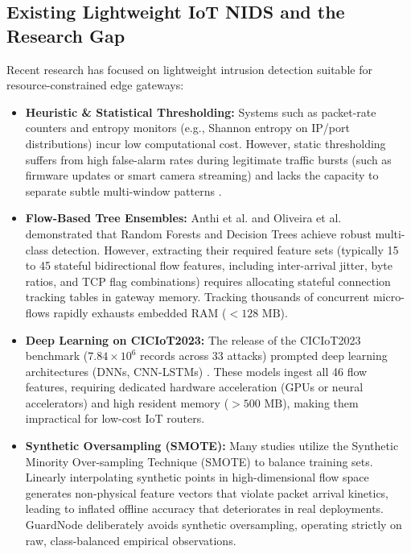 \documentclass[conference]{IEEEtran}
\begin{document}
\subsection{Existing Lightweight IoT NIDS and the Research Gap}
Recent research has focused on lightweight intrusion detection suitable for resource-constrained edge gateways:
\begin{itemize}
    \item \textbf{Heuristic & Statistical Thresholding:} Systems such as packet-rate counters and entropy monitors (e.g., Shannon entropy on IP/port distributions) incur low computational cost. However, static thresholding suffers from high false-alarm rates during legitimate traffic bursts (such as firmware updates or smart camera streaming) and lacks the capacity to separate subtle multi-window patterns \cite{ref_chaabouni}.
    \item \textbf{Flow-Based Tree Ensembles:} Anthi et al. \cite{ref_anthi} and Oliveira et al. \cite{ref_oliveira} demonstrated that Random Forests and Decision Trees achieve robust multi-class detection. However, extracting their required feature sets (typically 15 to 45 stateful bidirectional flow features, including inter-arrival jitter, byte ratios, and TCP flag combinations) requires allocating stateful connection tracking tables in gateway memory. Tracking thousands of concurrent micro-flows rapidly exhausts embedded RAM ($< 128\text{ MB}$).
    \item \textbf{Deep Learning on CICIoT2023:} The release of the CICIoT2023 benchmark \cite{ref_ciciot2023} ($7.84 \times 10^6$ records across 33 attacks) prompted deep learning architectures (DNNs, CNN-LSTMs) \cite{ref_ferrag, ref_vinayakumar}. These models ingest all 46 flow features, requiring dedicated hardware acceleration (GPUs or neural accelerators) and high resident memory ($> 500\text{ MB}$), making them impractical for low-cost IoT routers.
    \item \textbf{Synthetic Oversampling (SMOTE):} Many studies utilize the Synthetic Minority Over-sampling Technique (SMOTE) \cite{ref_smote} to balance training sets. Linearly interpolating synthetic points in high-dimensional flow space generates non-physical feature vectors that violate packet arrival kinetics, leading to inflated offline accuracy that deteriorates in real deployments. GuardNode deliberately avoids synthetic oversampling, operating strictly on raw, class-balanced empirical observations.
\end{itemize}
\end{document}
